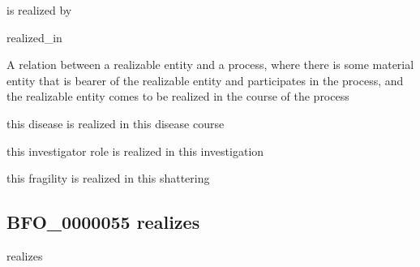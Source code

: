 \documentclass[letterpaper,10pt,english]{sphinxmanual}
\begin{document}
\begin{sphinxShadowBox}

\sphinxAtStartPar
is realized by

\sphinxAtStartPar
realized\_in
\end{sphinxShadowBox}

\begin{sphinxShadowBox}

\sphinxAtStartPar
{}
\end{sphinxShadowBox}

\begin{sphinxShadowBox}

\sphinxAtStartPar
A relation between a realizable entity and a process, where there is some material entity that is bearer of the realizable entity and participates in the process, and the realizable entity comes to be realized in the course of the process
\end{sphinxShadowBox}

\begin{sphinxShadowBox}

\sphinxAtStartPar
this disease is realized in this disease course

\sphinxAtStartPar
this investigator role is realized in this investigation

\sphinxAtStartPar
this fragility is realized in this shattering
\end{sphinxShadowBox}

\begin{sphinxShadowBox}

\sphinxAtStartPar
{}
\end{sphinxShadowBox}
\begin{quote}

\ignorespaces \end{quote}


\subsection{BFO\_0000055 \sphinxhyphen{} realizes}
\label{\detokenize{doc-BFO_0000055:bfo-0000055-realizes}}\label{\detokenize{doc-BFO_0000055:index-0}}\label{\detokenize{doc-BFO_0000055::doc}}
\begin{sphinxShadowBox}

\sphinxAtStartPar
realizes
\end{sphinxShadowBox}
\end{document}
